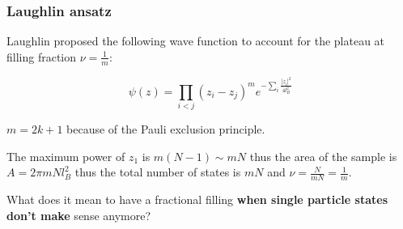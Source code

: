 \documentclass{beamer}
\begin{document}
\begin{frame}
\frametitle{Laughlin ansatz}
\begin{center}


Laughlin proposed the following wave function to account for the plateau at filling fraction $\nu = \frac{1}{m}$:

\[
\psi \left( z \right) = \prod_{i < j} \left( z_i - z_j \right)^m e^{-\sum_{i} \frac{| z_i |^2}{4 l_B^2}}
\]

$m = 2k + 1$ because of the Pauli exclusion principle.

The maximum power of $z_1$ is $m (N-1) \sim m N$ thus the area of the sample  is $A = 2 \pi m N l_B^2$ thus the total number of states is $mN$ and $\nu = \frac{N}{m N} = \frac{1}{m}$.

What does it mean to have a fractional filling \textbf{when single particle states don't make} sense anymore?




\end{center}
\end{frame}
\end{document}
